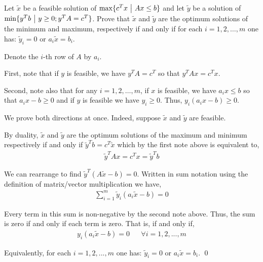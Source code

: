 \documentclass[10pt]{article}
\begin{document}
\begin{problem}[Exercise 2.27]
    Let \( \tilde{x} \) be a feasible solution of \( \max\{c^Tx ~\big|~ Ax\leq b\} \) and let \( \tilde{y} \) be a solution of \( \min\{y^Tb ~\big|~ y\geq 0; y^TA=c^T \} \). Prove that \( \tilde{x} \) and \( \tilde{y} \) are the optimum solutions of the minimum and maximum, respectively if and only if for each \( i=1,2,\ldots,m \) one has: \( \tilde{y}_i=0 \) or \( a_i\tilde{x} = b_i \).    
\end{problem}

\begin{solution}

Denote the \( i \)-th row of \( A \) by \( a_i \).

First, note that if \( y \) is feasible, we have \( y^TA = c^T \) so that \( y^TAx = c^Tx \).

Second, note also that for any \( i=1,2,\ldots,m \), if \( x \) is feasible, we have \( a_ix\leq b \) so that \( a_ix-b \geq 0 \) and if \( y \) is feasible we have \( y_i\geq 0 \). Thus, \( y_i(a_ix-b) \geq 0 \).


We prove both directions at once. Indeed, suppose \( \tilde{x} \) and \( \tilde{y} \) are feasible. 

By duality, 
 \( \tilde{x} \) and \( \tilde{y} \) are the optimum solutions of the maximum and minimum respectively if and only if \( \tilde{y}^T b = c^T \tilde{x} \) which by the first note above is equivalent to,
\begin{align*}
    \tilde{y}^TAx = c^Tx = \tilde{y}^Tb 
\end{align*}

We can rearrange to find \( \tilde{y}^T(A\tilde{x}-b) = 0 \). Written in sum notation using the definition of matrix/vector multiplication we have,
\begin{align*}
    \sum_{i=1}^{m} \tilde{y}_i \left( a_i\tilde{x}-b \right) = 0
\end{align*}

Every term in this sum is non-negative by the second note above. Thus, the sum is zero if and only if each term is zero. That is, if and only if,
\begin{align*}
    y_i(a_i\tilde{x}-b) = 0 && \forall i=1,2,...,m
\end{align*}

Equivalently, for each \( i=1,2,...,m \) one has: \( \tilde{y}_i=0 \) or \( a_i\tilde{x} = b_i \). \qed
\end{solution}
\end{document}
